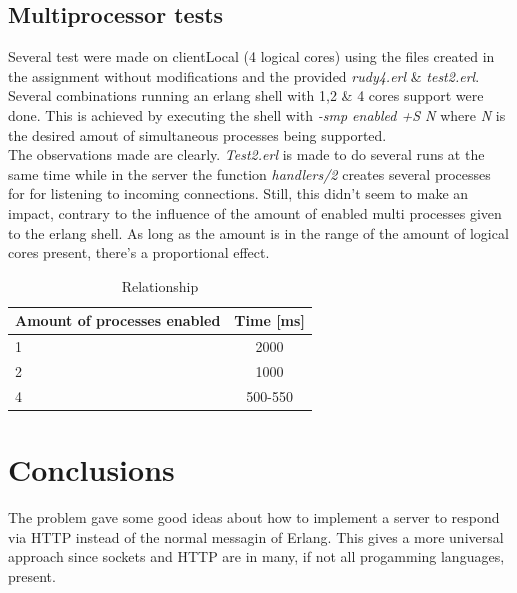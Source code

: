 \documentclass[a4paper, 11pt]{article}
\begin{document}
\subsection{Multiprocessor tests}
Several test were made on clientLocal (4 logical cores) using the files created in the assignment without modifications and the provided \textit{rudy4.erl} \& \textit{test2.erl}.
Several combinations running an erlang shell with 1,2 \& 4 cores support were done. This is achieved by executing the shell with \textit{-smp enabled +S N} where \textit{N} is the desired amout of simultaneous processes being supported.
\\The observations made are clearly.
\textit{Test2.erl} is made to do several runs at the same time while in the server the function \textit{handlers/2} creates several processes for for listening to incoming connections.
Still, this didn't seem to make an impact, contrary to the influence of the amount of enabled multi processes given to the erlang shell.
As long as the amount is in the range of the amount of logical cores present, there's a proportional effect.

\begin{table}[h]
\centering
\begin{tabular}{lc}
Amount of processes enabled           & Time [ms]  \\\hline
1      &  2000\\\hline
2      & 1000\\\hline
4     & 500-550\\\hline
\end{tabular}
\caption{Relationship}
\label{tab:relations}
\end{table}

\section{Conclusions}

The problem gave some good ideas about how to implement a server to respond via HTTP instead of the normal messagin of Erlang. This gives a more universal approach since sockets and HTTP are in many, if not all progamming languages, present.
\end{document}
